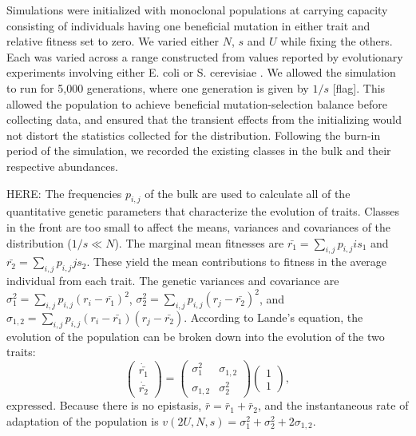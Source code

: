 \documentclass[9pt,twocolumn,twoside]{gsajnl}
\begin{document}
Simulations were initialized with monoclonal populations at carrying capacity consisting of individuals having one beneficial mutation in either trait and relative fitness set to zero. We varied either $N$, $s$ and $U$ while fixing the others. Each was varied across a range constructed from values reported by evolutionary experiments involving either E. coli or S. cerevisiae \citep{desai2007speed,Levy2015,Perfeito2007}. We allowed the simulation to run for 5,000 generations, where one generation is given by $1/s$ [flag]. This allowed the population to achieve beneficial mutation-selection balance before collecting data, and ensured that the transient effects from the initializing would not distort the statistics collected for the distribution. Following the burn-in period of the simulation, we recorded the existing classes in the bulk and their respective abundances. 

HERE: The frequencies $p_{i,j}$ of the bulk are used to calculate all of the quantitative genetic parameters that characterize the evolution of traits. Classes in the front are too small to affect the means, variances and covariances of the distribution  ($1/s \ll N$).  The marginal mean fitnesses are  $\bar{r_1}=\sum_{i,j} p_{i,j} is_1$ and $\bar{r_2}=\sum_{i,j} p_{i,j} j s_2$. These  yield the mean contributions to fitness in the average individual from each trait. The genetic variances and covariance are $\sigma_1^2 = \sum_{i,j} p_{i,j} (r_i-\bar{r_1})^2$, $\sigma_2^2 = \sum_{i,j} p_{i,j} (r_j-\bar{r_2})^2$, and  $\sigma_{1,2} =\sum_{i,j} p_{i,j} (r_i-\bar{r_1})(r_j-\bar{r_2})$. According to Lande's equation, the evolution of the population can be broken down into the evolution of the two traits:
\begin{equation}\label{eq:4}
\left( \begin{array}{c}
\dot{\bar{r_1}} \\
\dot{\bar{r_2}} 
\end{array} \right)
=
\left( \begin{array}{cc}
\sigma_1^2 & \sigma_{1,2} \\
\sigma_{1,2} & \sigma_2^2 
\end{array}\right)
\left(\begin{array}{c}
1 \\
1 
\end{array}\right),
\end{equation}
 expressed. Because there is no epistasis, $\bar{r} = \bar{r}_1 +\bar{r}_2$, and the instantaneous rate of adaptation of the population is $v(2U,N,s) = \sigma_1^2 +\sigma_2^2 + 2 \sigma_{1,2}$.  
\end{document}
